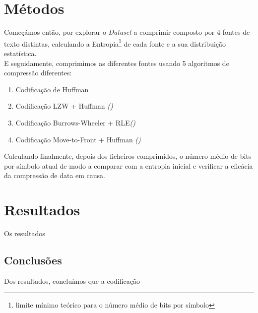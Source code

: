 \documentclass[11pt,journal,compsoc]{IEEEtran}
\begin{document}

\section{Métodos}\label{sec:metodos}
Começámos então, por explorar o \textit{Dataset} a comprimir composto por 4 fontes de texto distintas, calculando a Entropia\footnote{limite mínimo teórico para o número médio de bits por símbolo} de cada fonte e a sua distribuição estatística.\\
E seguidamente, comprimimos as diferentes fontes usando 5 algoritmos de compressão diferentes:

\begin{enumerate}
    \item Codificação de Huffman
    \item Codificação LZW + Huffman \textit{()}
    \item Codificação Burrows-Wheeler + RLE\textit{()}
    \item Codificação Move-to-Front + Huffman \textit{()}
\end{enumerate}


Calculando finalmente, depois dos ficheiros comprimidos, o número médio de bits por símbolo atual de modo a comparar com a entropia inicial e verificar a eficácia da compressão de data em causa.

\section{Resultados} %
Os resultados 



\subsection{Conclusões}
Dos resultados, concluímos que a codificação
\end{document}
